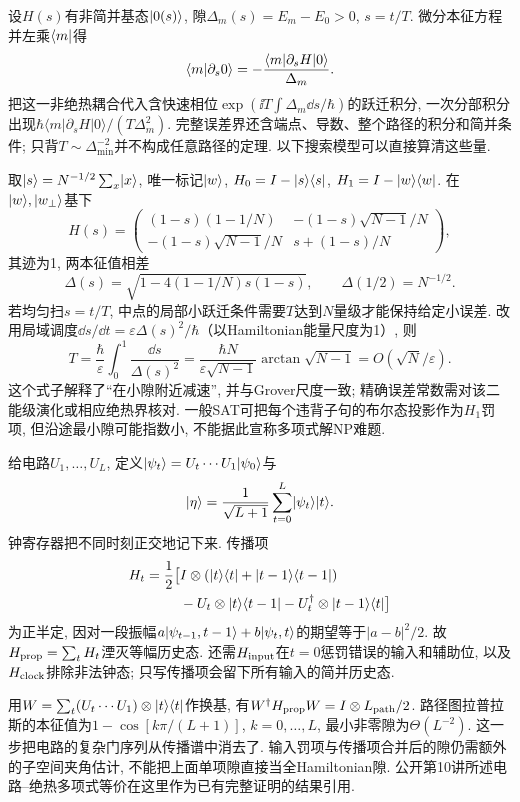 设$H(s)$有非简并基态$\lvert 0(s)\rangle$, 隙$\Delta_m(s)=E_m-E_0>0$, $s=t/T$. 微分本征方程并左乘$\langle m\rvert$得
\[\langle m\vert \partial_s0\rangle=
 -\frac{\langle m\rvert\partial_sH\lvert 0\rangle}{\Delta_m}.
\]
把这一非绝热耦合代入含快速相位$\exp(\ii T\int\Delta_m\dd s/\hbar)$的跃迁积分, 一次分部积分出现$\hbar\langle m|\partial_sH|0\rangle/(T\Delta_m^2)$. 完整误差界还含端点、导数、整个路径的积分和简并条件; 只背$T\sim\Delta_{\min}^{-2}$并不构成任意路径的定理. 以下搜索模型可以直接算清这些量.

取$\lvert s\rangle=N^{-1/2}\sum_x\lvert x\rangle$, 唯一标记$\lvert w\rangle$, $H_0=I-\lvert s\rangle\langle s\rvert$, $H_1=I-\lvert w\rangle\langle w\rvert$. 在$\lvert w\rangle,\lvert w_\perp\rangle$基下
\[H(s)=\begin{pmatrix}(1-s)(1-1/N)&-(1-s)\sqrt{N-1}/N\\
 -(1-s)\sqrt{N-1}/N&s+(1-s)/N\end{pmatrix},\]
其迹为1, 两本征值相差
\[\Delta(s)=\sqrt{1-4(1-1/N)s(1-s)},\qquad \Delta(1/2)=N^{-1/2}.\]
若均匀扫$s=t/T$, 中点的局部小跃迁条件需要$T$达到$N$量级才能保持给定小误差. 改用局域调度$\dd s/\dd t=\varepsilon\Delta(s)^2/\hbar$（以Hamiltonian能量尺度为1）, 则
\[T=\frac{\hbar}{\varepsilon}\int_0^1\frac{\dd s}{\Delta(s)^2}
 =\frac{\hbar N}{\varepsilon\sqrt{N-1}}\arctan\sqrt{N-1}
 =O(\sqrt N/\varepsilon).\]
这个式子解释了“在小隙附近减速”, 并与Grover尺度一致; 精确误差常数需对该二能级演化或相应绝热界核对. 一般SAT可把每个违背子句的布尔态投影作为$H_1$罚项, 但沿途最小隙可能指数小, 不能据此宣称多项式解NP难题.

给电路$U_1,\ldots,U_L$, 定义$\lvert \psi_t\rangle=U_t\cdots U_1\lvert \psi_0\rangle$与
\[\lvert \eta\rangle=\frac1{\sqrt{L+1}}\sum_{t=0}^L\lvert \psi_t\rangle\lvert t\rangle.\]
钟寄存器把不同时刻正交地记下来. 传播项
\begin{align*}H_t=\frac12\big[&I\otimes(\lvert t\rangle\langle t\rvert+\lvert t-1\rangle\langle t-1\rvert)\\
 &-U_t\otimes\lvert t\rangle\langle t-1\rvert-U_t^\dagger\otimes\lvert t-1\rangle\langle t\rvert\big]
\end{align*}
为正半定, 因对一段振幅$a\lvert \psi_{t-1},t-1\rangle+b\lvert \psi_t,t\rangle$的期望等于$|a-b|^2/2$. 故$H_{\rm prop}=\sum_tH_t$湮灭等幅历史态. 还需$H_{\rm input}$在$t=0$惩罚错误的输入和辅助位, 以及$H_{\rm clock}$排除非法钟态; 只写传播项会留下所有输入的简并历史态.

用$W=\sum_t(U_t\cdots U_1)\otimes\lvert t\rangle\langle t\rvert$作换基, 有$W^\dagger H_{\rm prop}W=I\otimes L_{\rm path}/2$. 路径图拉普拉斯的本征值为$1-\cos[k\pi/(L+1)]$, $k=0,\ldots,L$, 最小非零隙为$\Theta(L^{-2})$. 这一步把电路的复杂门序列从传播谱中消去了. 输入罚项与传播项合并后的隙仍需额外的子空间夹角估计, 不能把上面单项隙直接当全Hamiltonian隙. 公开第10讲所述电路--绝热多项式等价在这里作为已有完整证明的结果引用.

